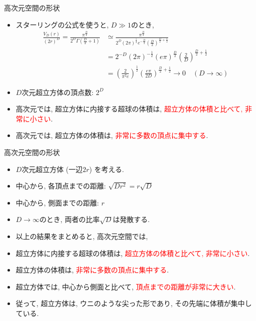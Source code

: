 \documentclass[dvipdfmx,notheorems,t]{beamer}
\begin{document}
\begin{frame}{高次元空間の形状}
\begin{itemize}
  \item スターリングの公式を使うと, $D \gg 1$のとき,
  \begin{align*}
    \frac{V_D(r)}{(2r)^D}
      = \frac{\pi^\frac{D}{2}}{2^D \Gamma \left( \frac{D}{2} + 1 \right)}
      &\simeq \frac{\pi^\frac{D}{2}}{2^D (2\pi)^\frac{1}{2} e^{-\frac{D}{2}}
      \left( \frac{D}{2} \right)^{\frac{D}{2} + \frac{1}{2}}} \\
      &= 2^{-D} (2\pi)^{-\frac{1}{2}} (e\pi)^\frac{D}{2} \left( \frac{2}{D} \right)^{\frac{D}{2} + \frac{1}{2}} \\
      &= \left( \frac{2}{\pi^2 e} \right)^\frac{1}{2} \left( \frac{e\pi}{2D} \right)^{\frac{D}{2} + \frac{1}{2}}
      \to 0 \quad (D \to \infty)
  \end{align*}

  \item $D$次元超立方体の頂点数: $2^D$

  \item 高次元では, 超立方体に内接する超球の体積は, \textcolor{red}{超立方体の体積と比べて, 非常に小さい}.
  \item 高次元では, 超立方体の体積は, \textcolor{red}{非常に多数の頂点に集中する}.
\end{itemize}
\end{frame}

\begin{frame}{高次元空間の形状}
\begin{itemize}
  \item $D$次元超立方体 (一辺$2r$) を考える.
  \item 中心から, 各頂点までの距離: $\sqrt{D r^2} = r \sqrt{D}$
  \item 中心から, 側面までの距離: $r$
  \item $D \to \infty$のとき, 両者の比率$\sqrt{D}$は発散する. \newline

  \item 以上の結果をまとめると, 高次元空間では,
  \item 超立方体に内接する超球の体積は, \textcolor{red}{超立方体の体積と比べて, 非常に小さい}.
  \item 超立方体の体積は, \textcolor{red}{非常に多数の頂点に集中する}.
  \item 超立方体では, 中心から側面と比べて, \textcolor{red}{頂点までの距離が非常に大きい}.
  \item 従って, 超立方体は, ウニのような尖った形であり, その先端に体積が集中している.
\end{itemize}
\end{frame}
\end{document}
